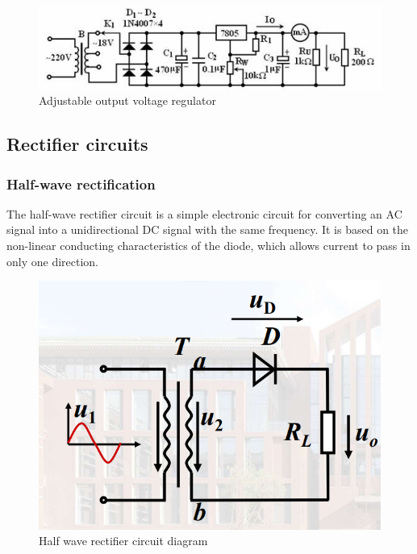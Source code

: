 \documentclass[UTF8]{article}
\begin{document}
    	\begin{figure}[H]
    	    	\centering
    	    	\includegraphics[clip,scale=1,trim={0 0 0 0}]{fig/fig4.png}
    	        \caption{Adjustable output voltage regulator}
    	        \label{figure.4}
        \end{figure}   
   
   \subsection{Rectifier circuits}
   \subsubsection{Half-wave rectification}
   The half-wave rectifier circuit is a simple electronic circuit for converting an AC signal into a unidirectional DC signal with the same frequency. It is based on the non-linear conducting characteristics of the diode, which allows current to pass in only one direction.

    	\begin{figure}[H]
    	    	\centering
    	    	\includegraphics[clip,scale=0.8,trim={0 0 0 0}]{fig/fig5.png}
    	        \caption{Half wave rectifier circuit diagram}
    	        \label{figure.5}
        \end{figure}  
   
\end{document}
